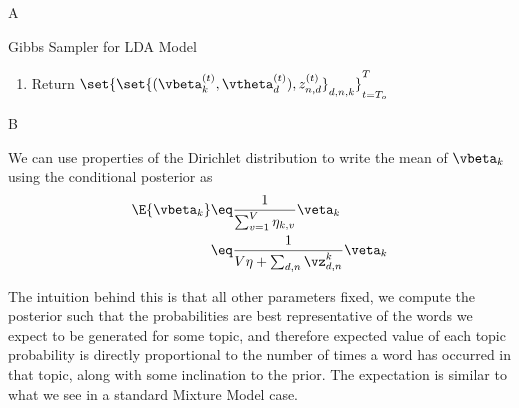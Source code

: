 \documentclass{article}
\begin{document}
\begin{question}
\begin{qpart}{A}
\begin{algo}[0.9\textwidth]{Gibbs Sampler for LDA Model}
\begin{enumerate}[label=\bt{\arabic*.}]
\begin{addmargin}{1.2em}
\begin{enumerate}[label=\bt{\alph*.}]
							\item For all $d \in \brac{D}$, $n \in \brac{N}$, sample $z_{d, n}$ as
								\begin{align*}
									\set{z_{d, n}}^{(t + 1)} \sim \tfunc{Multinoulli}{\set{\gamma_{d, n}^1}^{(t + 1)} \dots \set{\gamma_{d, n}^K}^{(t + 1)}}
								\end{align*}
								where
								\begin{align*}
									\qforall k \in \brac{K}, \quad \set{\gamma_{d, n}^k}^{(t + 1)} \eq \frac{\set{\beta_{k, w_{d, n}}}^{(t + 1)} \cdot \set{\theta_{d, k}}^{(t + 1)}}{\sum_{k' = 1}^K \para{\set{\beta_{k', w_{d, n}}}^{(t + 1)} \cdot \set{\theta_{d, k'}}^{(t + 1)}}^{\set{\vz_{d, n}^{k'}}^{(t + 1)}}}
								\end{align*}
						\end{enumerate}

					\end{addmargin}

				\item Return $\set{\set{(\vbeta_k^{(t)}, \vtheta_d^{(t)}), z_{n, d}^{(t)}}_{d, n, k}}_{t = T_o}^T$

			\end{enumerate}

		\end{algo}

	\end{qpart}

	\begin{qpart}{B}

		\begin{enumerate}[label=\bt{\theenumi.}]

				We can use properties of the Dirichlet distribution to write the mean of $\vbeta_k$ using the conditional posterior as
				\begin{align*}
					\E{\vbeta_k} &\eq \frac{1}{\sum_{v = 1}^V \eta_{k, v}} \veta_k \\
					&\eq \frac{1}{V \eta + \sum_{d, n} \vz_{d, n}^k} \veta_k
				\end{align*}

				The intuition behind this is that all other parameters fixed, we compute the posterior such that the probabilities are best representative of the words we expect to be generated for some topic, and therefore expected value of each topic probability is directly proportional to the number of times a word has occurred in that topic, along with some inclination to the prior.
				The expectation is similar to what we see in a standard Mixture Model case.


\end{enumerate}
\end{qpart}
\end{question}
\end{document}
